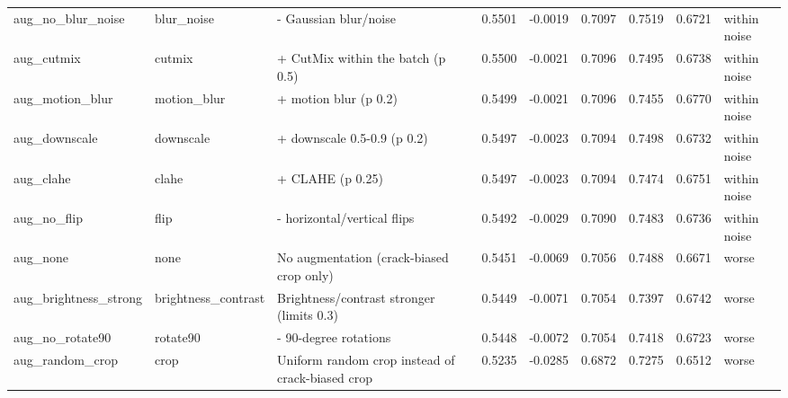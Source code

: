 \begin{table}
\begin{tabular}{lllrrrrrl}
aug\_no\_blur\_noise & blur\_noise & - Gaussian blur/noise & 0.5501 & -0.0019 & 0.7097 & 0.7519 & 0.6721 & within noise \\
aug\_cutmix & cutmix & + CutMix within the batch (p 0.5) & 0.5500 & -0.0021 & 0.7096 & 0.7495 & 0.6738 & within noise \\
aug\_motion\_blur & motion\_blur & + motion blur (p 0.2) & 0.5499 & -0.0021 & 0.7096 & 0.7455 & 0.6770 & within noise \\
aug\_downscale & downscale & + downscale 0.5-0.9 (p 0.2) & 0.5497 & -0.0023 & 0.7094 & 0.7498 & 0.6732 & within noise \\
aug\_clahe & clahe & + CLAHE (p 0.25) & 0.5497 & -0.0023 & 0.7094 & 0.7474 & 0.6751 & within noise \\
aug\_no\_flip & flip & - horizontal/vertical flips & 0.5492 & -0.0029 & 0.7090 & 0.7483 & 0.6736 & within noise \\
aug\_none & none & No augmentation (crack-biased crop only) & 0.5451 & -0.0069 & 0.7056 & 0.7488 & 0.6671 & worse \\
aug\_brightness\_strong & brightness\_contrast & Brightness/contrast stronger (limits 0.3) & 0.5449 & -0.0071 & 0.7054 & 0.7397 & 0.6742 & worse \\
aug\_no\_rotate90 & rotate90 & - 90-degree rotations & 0.5448 & -0.0072 & 0.7054 & 0.7418 & 0.6723 & worse \\
aug\_random\_crop & crop & Uniform random crop instead of crack-biased crop & 0.5235 & -0.0285 & 0.6872 & 0.7275 & 0.6512 & worse \\
\bottomrule
\end{tabular}
\end{table}
